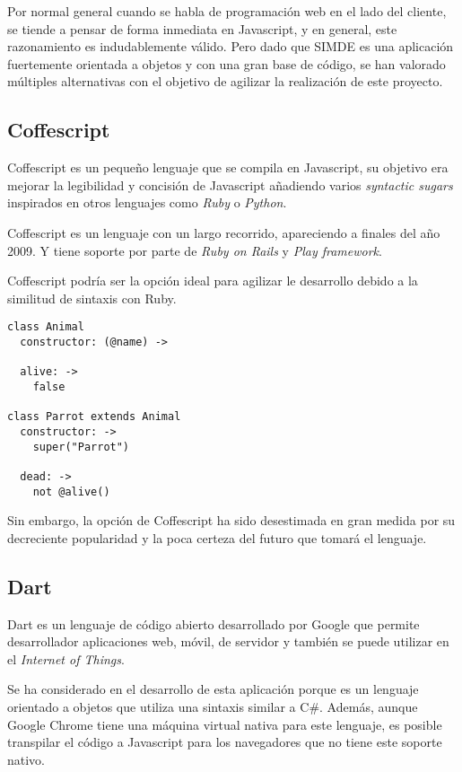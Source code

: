 Por normal general cuando se habla de programación web en el lado del cliente, se tiende a pensar
de forma inmediata en Javascript, y en general, este razonamiento es indudablemente válido. 
Pero dado que SIMDE es una aplicación fuertemente orientada a objetos y con una gran base de código, 
se han valorado múltiples alternativas con el objetivo de agilizar la realización de este proyecto.

\subsection{Coffescript}

Coffescript es un pequeño lenguaje que se compila en Javascript, su objetivo era mejorar la legibilidad 
y concisión de Javascript añadiendo varios \textit{syntactic sugars} inspirados en otros lenguajes como
\textit{Ruby} o \textit{Python}. \cite{Coffescript}

\bigskip
Coffescript es un lenguaje con un largo recorrido, apareciendo a finales del año 2009. Y tiene soporte por
parte de \textit{Ruby on Rails} y \textit{Play framework}. \cite{CoffescriptWiki}

\bigskip 
Coffescript podría ser la opción ideal para agilizar le desarrollo debido a la similitud de sintaxis con 
Ruby.

\begin{lstlisting}
class Animal
  constructor: (@name) ->

  alive: ->
    false

class Parrot extends Animal
  constructor: ->
    super("Parrot")

  dead: ->
    not @alive()
\end{lstlisting}

\bigskip
Sin embargo, la opción de Coffescript ha sido desestimada en gran medida por su decreciente popularidad
y la poca certeza del futuro que tomará el lenguaje.

\subsection{Dart}

Dart es un lenguaje de código abierto desarrollado por Google que permite desarrollador aplicaciones web, móvil, 
de servidor y también se puede utilizar en el \textit{Internet of Things}. \cite{Dart}

\bigskip
Se ha considerado en el desarrollo de esta aplicación porque es un lenguaje orientado a objetos que utiliza una 
sintaxis similar a C\#. Además, aunque Google Chrome tiene una máquina virtual nativa para este lenguaje, es posible
transpilar el código a Javascript para los navegadores que no tiene este soporte nativo.

